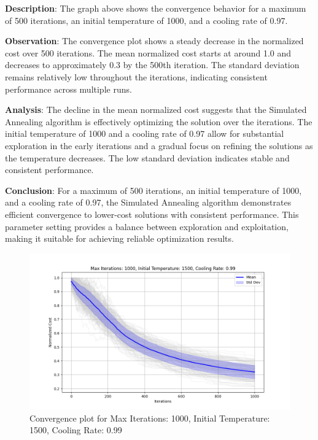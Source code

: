 \documentclass{article}
\begin{document}
    \textbf{Description}: The graph above shows the convergence behavior for a maximum of 500 iterations, an initial temperature of 1000, and a cooling rate of 0.97.

    \textbf{Observation}: The convergence plot shows a steady decrease in the normalized cost over 500 iterations. The mean normalized cost starts at around 1.0 and decreases to approximately 0.3 by the 500th iteration. The standard deviation remains relatively low throughout the iterations, indicating consistent performance across multiple runs.

    \textbf{Analysis}: The decline in the mean normalized cost suggests that the Simulated Annealing algorithm is effectively optimizing the solution over the iterations. The initial temperature of 1000 and a cooling rate of 0.97 allow for substantial exploration in the early iterations and a gradual focus on refining the solutions as the temperature decreases. The low standard deviation indicates stable and consistent performance.

    \textbf{Conclusion}: For a maximum of 500 iterations, an initial temperature of 1000, and a cooling rate of 0.97, the Simulated Annealing algorithm demonstrates efficient convergence to lower-cost solutions with consistent performance. This parameter setting provides a balance between exploration and exploitation, making it suitable for achieving reliable optimization results.

    \begin{figure}[H]
        \centering
        \includegraphics[width=\textwidth]{simulated_annealing/max_iter_1000_init_temp_1500_cooling_rate_0.99}
        \caption{Convergence plot for Max Iterations: 1000, Initial Temperature: 1500, Cooling Rate: 0.99}
        \label{fig:sa_1000_1500_0.99}
    \end{figure}
\end{document}
